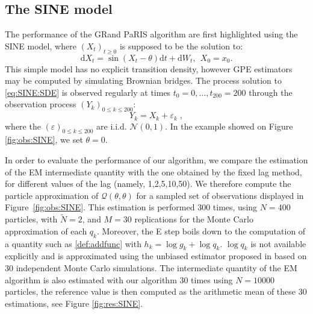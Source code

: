 \documentclass[12pt,draft]{article}
\newcommand{\rmd}{\mathrm{d}}
\newcommand{\eqsp}{\;}
\newcommand{\1}{\mathrm{1}}
\begin{document}
\subsection*{The SINE model} 
The performance of the GRand PaRIS algorithm are first highlighted using the SINE model, where $(X_t)_{t\geq 0}$ is supposed to be the solution to: 
\begin{equation}
\rmd X_t = \sin \left(X_t-\theta\right)\rmd t + \rmd W_t,~~X_0=x_0. \label{eq:SINE:SDE}
\end{equation}
This simple model has no explicit transition density, however GPE estimators may be computed by simulating Brownian bridges.
The process solution to \eqref{eq:SINE:SDE} is observed regularly at times $t_0=0,\ldots,t_{200}=200$ through the observation process $(Y_k)_{0\leq k \leq 200}$:
\begin{equation}
Y_k = X_k + \varepsilon_k\label{eq:obs:SINE}\eqsp,
\end{equation}
where the $(\varepsilon)_{0\leq k \leq 200}$ are i.i.d. $\mathcal{N}(0,1)$.
In the example showed on Figure \ref{fig:obs:SINE}, we set $\theta=0$.

In order to evaluate the performance of our algorithm, we compare the estimation of the EM intermediate quantity with the one obtained by the fixed lag method, for different values of the lag (namely, 1,2,5,10,50). We therefore compute the particle approximation of $\mathcal{Q}(\theta,\theta)$ for a sampled set of observations displayed in Figure~\ref{fig:obs:SINE}.
This estimation is performed 300 times, using $N=400$ particles, with $\tilde{N}=2$, and $M=30$ replications for the Monte Carlo approximation of each $q_k$.  Moreover, the E step boils down to the computation of a quantity such as \eqref{def:addfunc} with $h_k= \log g_k + \log q_k$.  $\log q_k$ is not available explicitly and is approximated using the unbiased estimator proposed in \cite[Appendix B]{olsson:strojby:2011} based on 30 independent Monte Carlo simulations.
The intermediate quantity of the EM algorithm is also estimated with our algorithm 30 times using $N=10000$ particles, the reference value is then computed as the arithmetic mean of these 30 estimations, see Figure \ref{fig:res:SINE}.
\end{document}
